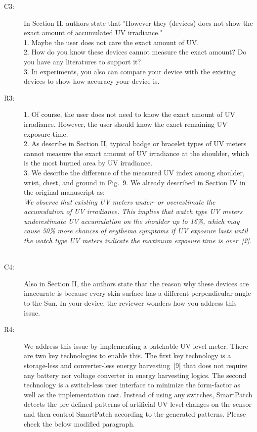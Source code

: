 \documentclass[onecolumn]{IEEEconf}
\begin{document}
\begin{description}
\item [C3: ] In Section II, authors state that "However they (devices) does not show the exact amount of accumulated UV irradiance." \\
1. Maybe the user does not care the exact amount of UV. \\
2. How do you know these devices cannot measure the exact amount? Do you have any literatures to support it?\\
3. In experiments, you also can compare your device with the existing devices to show how accuracy your device is.
\item [R3: ] 1. Of course, the user does not need to know the exact amount of UV irradiance. However, the user should know the exact remaining UV exposure time.\\
2. As describe in Section II, typical badge or bracelet types of UV meters cannot measure the exact amount of UV irradiance at the shoulder, which is the most burned area by UV irradiance.\\
3. We describe the difference of the measured UV index among shoulder, wrist, chest, and ground in Fig.~9. We already described in Section IV in the original manuscript as:\\

\textit{We observe that existing UV meters under- or overestimate the accumulation of UV irradiance. This implies that watch type UV meters underestimate UV accumulation on the shoulder up to 16\%, which may cause 50\% more chances of erythema symptoms if UV exposure lasts until the watch type UV meters indicate the maximum exposure time is over~[2].}
~\\

\item [C4: ] Also in Section II, the authors state that the reason why these devices are inaccurate is because every skin surface has a different perpendicular angle to the Sun. In your device, the reviewer wonders how you address this issue.
\item [R4: ] We address this issue by implementing a patchable UV level meter. There are two key technologies to enable this. The first key technology is a storage-less and converter-less energy harvesting~[9] that does not require any battery nor voltage converter in energy harvesting logics. The second technology is a switch-less user interface to minimize the form-factor as well as the implementation cost. Instead of using any switches, SmartPatch detects the pre-defined patterns of artificial UV-level changes on the sensor and then control SmartPatch according to the generated patterns. Please check the below modified paragraph.\\  


\end{description}
\end{document}
